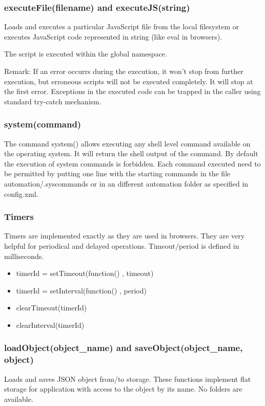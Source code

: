 \subsubsection{executeFile(filename) and executeJS(string)}

Loads and executes a particular JavaScript file from the local filesystem or executes 
JavaScript code represented in string (like eval in browsers).

The script is executed within the global namespace.

Remark: If an error occurrs during the execution, it won't stop from further execution, 
but erroneous scripts will not be executed completely. It will stop at the first error.
Exceptions in the executed code can be trapped in the caller using standard try-catch mechanism.

\subsubsection{system(command)}

The command system() allows executing any shell level command available on the operating 
system. It will return the shell output of the command.  By default the execution of 
system commands is forbidden. Each command executed need to be permitted by putting one 
line with the starting commands in the file automation/.syscommands or in an different 
automation folder as specified in config.xml.

\subsubsection{Timers}
Timers are implemented exactly as they are used in browsers. They are very helpful for 
periodical and delayed operations. Timeout/period is defined in milliseconds.
\begin{itemize}
\item timerId = setTimeout(function() { }, timeout)
\item timerId = setInterval(function() { }, period)
\item clearTimeout(timerId)
\item clearInterval(timerId)
\end{itemize}

\subsubsection{loadObject(object\_name) and saveObject(object\_name, object)}
Loads and saves JSON object from/to storage. These functions implement flat storage for 
application with access to the object by its name. No folders are available.

